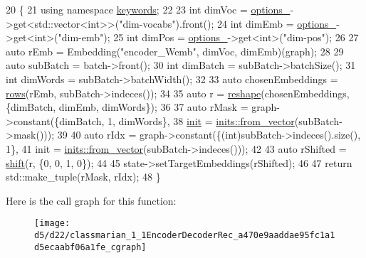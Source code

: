 \begin{DoxyCode}
20                                   \{
21     \textcolor{keyword}{using namespace }\hyperlink{namespacekeywords}{keywords};
22 
23     \textcolor{keywordtype}{int} dimVoc = \hyperlink{classmarian_1_1EncoderDecoder_a467e7d547bd7888d1bea248e99cef212}{options\_}->get<std::vector<int>>(\textcolor{stringliteral}{"dim-vocabs"}).front();
24     \textcolor{keywordtype}{int} dimEmb = \hyperlink{classmarian_1_1EncoderDecoder_a467e7d547bd7888d1bea248e99cef212}{options\_}->get<\textcolor{keywordtype}{int}>(\textcolor{stringliteral}{"dim-emb"});
25     \textcolor{keywordtype}{int} dimPos = \hyperlink{classmarian_1_1EncoderDecoder_a467e7d547bd7888d1bea248e99cef212}{options\_}->get<\textcolor{keywordtype}{int}>(\textcolor{stringliteral}{"dim-pos"});
26 
27     \textcolor{keyword}{auto} rEmb = Embedding(\textcolor{stringliteral}{"encoder\_Wemb"}, dimVoc, dimEmb)(graph);
28 
29     \textcolor{keyword}{auto} subBatch = batch->front();
30     \textcolor{keywordtype}{int} dimBatch = subBatch->batchSize();
31     \textcolor{keywordtype}{int} dimWords = subBatch->batchWidth();
32 
33     \textcolor{keyword}{auto} chosenEmbeddings = \hyperlink{namespacemarian_ace1e9a63d52edc363d70d661cf8d0257}{rows}(rEmb, subBatch->indeces());
34 
35     \textcolor{keyword}{auto} r = \hyperlink{namespacemarian_acd984f43188d0ae23c2a6ef13ae5293f}{reshape}(chosenEmbeddings, \{dimBatch, dimEmb, dimWords\});
36 
37     \textcolor{keyword}{auto} rMask = graph->constant(\{dimBatch, 1, dimWords\},
38                                  \hyperlink{amunmt_8cpp_a2e8ddb8bd2f3405f554c9f2c52277f4b}{init} = \hyperlink{namespacemarian_1_1inits_ab9566318ddbacd376c74cdbdfac091e4}{inits::from\_vector}(subBatch->mask()));
39 
40     \textcolor{keyword}{auto} rIdx = graph->constant(\{(int)subBatch->indeces().size(), 1\},
41                                 init = \hyperlink{namespacemarian_1_1inits_ab9566318ddbacd376c74cdbdfac091e4}{inits::from\_vector}(subBatch->indeces()));
42 
43     \textcolor{keyword}{auto} rShifted = \hyperlink{namespacemarian_a763e5e9b5d5a329d2420fe9bab95476d}{shift}(r, \{0, 0, 1, 0\});
44 
45     state->setTargetEmbeddings(rShifted);
46 
47     \textcolor{keywordflow}{return} std::make\_tuple(rMask, rIdx);
48   \}
\end{DoxyCode}


Here is the call graph for this function\+:
\nopagebreak
\begin{figure}[H]
\begin{center}
\leavevmode
\texttt{[image: d5/d22/classmarian\_1\_1EncoderDecoderRec\_a470e9aaddae95fc1a1d5ecaabf06a1fe\_cgraph]}
\end{center}
\end{figure}




